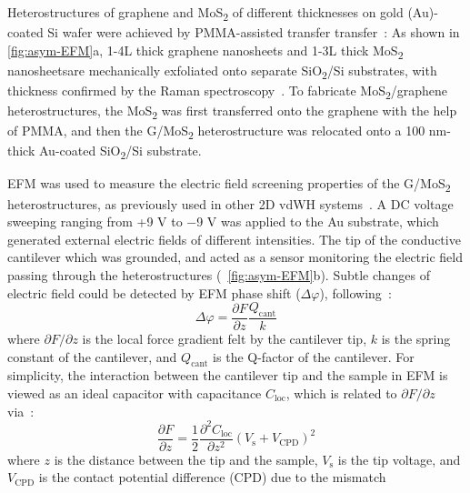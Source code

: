Heterostructures of graphene and MoS\textsubscript{2} of different thicknesses on gold (Au)-coated Si wafer were achieved by PMMA-assisted transfer
transfer~\cite{Minemawari_2011_inkjet_PMMA}:
%
As shown in \autoref{fig:asym-EFM}a, 1-4L thick graphene nanosheets and 1-3L
thick MoS\textsubscript{2} nanosheetsare mechanically exfoliated onto
separate SiO\textsubscript{2}/Si substrates, with thickness confirmed
by the Raman
spectroscopy~\cite{Ferrari_2006_raman,Lee_2010_anomal_raman_mos2,Chakraborty_2012_mos2_layer_raman}.
%
To fabricate MoS\textsubscript{2}/graphene heterostructures, the
MoS\textsubscript{2} was first transferred onto the graphene with the
help of PMMA, and then the G/MoS\textsubscript{2} hetero\-structure
was relocated onto a 100 nm-thick Au-coated SiO\textsubscript{2}/Si
substrate.
%

EFM was used to measure the electric field screening properties of the
G/MoS\textsubscript{2} heterostructures, as previously used in other
2D vdWH
systems~\cite{Datta_2009_ML_Screening,Castellanos_Gomez_2012_interlayer,Li_2014_screen}.
%
A DC voltage sweeping ranging from +9 V to −9 V was applied to the Au
substrate, which generated external electric fields of different
intensities. The tip of the conductive cantilever which was grounded,
and acted as a sensor monitoring the electric field passing through
the heterostructures (~\autoref{fig:asym-EFM}b).
%
Subtle changes of electric field could be detected by EFM phase shift
($\Delta \varphi$), following~\cite{Li_2014_screen}:
\begin{equation}
  \label{eq:asym-phase-change}
  \Delta \varphi = \frac{\partial F}{\partial z} \frac{Q_{\mathrm{cant}}}{k} 
\end{equation}
where $\partial F/ \partial z$ is the local force gradient felt by the
cantilever tip, $k$ is the spring constant of the cantilever, and $Q_{\mathrm{cant}}$
is the Q-factor of the cantilever.
%
For simplicity, the interaction between the cantilever tip and the
sample in EFM is viewed as an ideal capacitor with capacitance
$C_{\mathrm{loc}}$, which is related to $\partial F/ \partial z$ via~\cite{Li_2014_screen}:
\begin{equation}
  \label{eq:asym-capaci-cant}
  \frac{\partial F}{\partial z} = \frac{1}{2} \frac{\partial^{2} C_{\mathrm{loc}}}{\partial z^{2}} (V_{\mathrm{s}} + V_{\mathrm{CPD}})^{2}
\end{equation}
where $z$ is the distance between the tip
and the sample, $V_{\mathrm{s}}$ is the tip voltage, and $V_{\mathrm{CPD}}$ is the contact potential difference (CPD) due to the  mismatch

